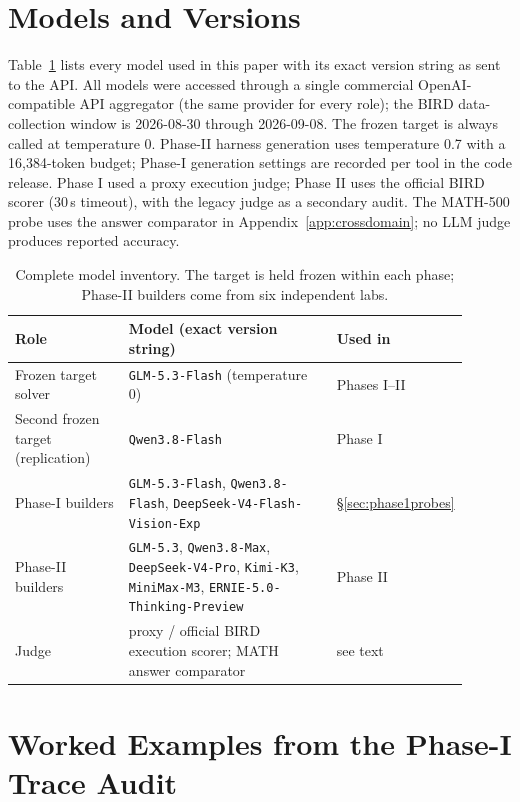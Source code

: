 \section{Models and Versions}\label{app:models}

Table~\ref{tab:models} lists every model used in this paper with its exact
version string as sent to the API. All models were accessed through a single
commercial OpenAI-compatible API aggregator (the same provider for every
role); the BIRD data-collection window is 2026-08-30 through 2026-09-08. The frozen
target is always called at temperature 0. Phase-II harness generation uses
temperature 0.7 with a 16{,}384-token budget; Phase-I generation settings are
recorded per tool in the code release. Phase I used a proxy execution judge;
Phase II uses the official BIRD scorer (30\,s timeout), with the legacy
judge as a secondary audit. The MATH-500 probe uses the answer comparator
in Appendix~\ref{app:crossdomain}; no LLM judge produces reported accuracy.

\begin{table}[h]
\centering
\small
\begin{tabular}{p{0.26\linewidth}p{0.50\linewidth}p{0.14\linewidth}}
\toprule
Role & Model (exact version string) & Used in \\
\midrule
Frozen target solver & \texttt{GLM-5.3-Flash} (temperature 0) & Phases I--II \\
Second frozen target (replication) & \texttt{Qwen3.8-Flash} & Phase I \\
Phase-I builders & \texttt{GLM-5.3-Flash}, \texttt{Qwen3.8-Flash},
\texttt{DeepSeek-V4-Flash-Vision-Exp} & \S\ref{sec:phase1probes} \\
Phase-II builders & \texttt{GLM-5.3}, \texttt{Qwen3.8-Max},
\texttt{DeepSeek-V4-Pro}, \texttt{Kimi-K3}, \texttt{MiniMax-M3},
\texttt{ERNIE-5.0-Thinking-Preview} & Phase II \\
Judge & proxy / official BIRD execution scorer; MATH answer comparator & see text \\
\bottomrule
\end{tabular}
\caption{Complete model inventory. The target is held frozen within each
phase; Phase-II builders come from six independent labs.}
\label{tab:models}
\end{table}

\section{Worked Examples from the Phase-I Trace Audit}\label{app:examples}

